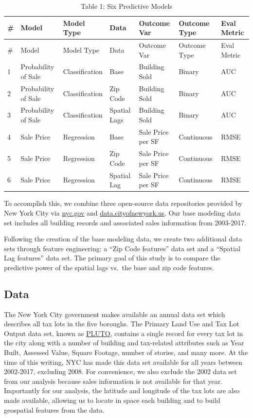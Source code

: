 \documentclass[]{article}
\begin{document}
\begin{longtable}[]{@{}lllllll@{}}
\caption{Table 1: Six Predictive Models}\tabularnewline
\toprule
\# & Model & Model Type & Data & Outcome Var & Outcome Type & Eval
Metric\tabularnewline
\midrule
\endfirsthead
\toprule
\# & Model & Model Type & Data & Outcome Var & Outcome Type & Eval
Metric\tabularnewline
\midrule
\endhead
1 & Probability of Sale & Classification & Base & Building Sold & Binary
& AUC\tabularnewline
2 & Probability of Sale & Classification & Zip Code & Building Sold &
Binary & AUC\tabularnewline
3 & Probability of Sale & Classification & Spatial Lags & Building Sold
& Binary & AUC\tabularnewline
4 & Sale Price & Regression & Base & Sale Price per SF & Continuous &
RMSE\tabularnewline
5 & Sale Price & Regression & Zip Code & Sale Price per SF & Continuous
& RMSE\tabularnewline
6 & Sale Price & Regression & Spatial Lag & Sale Price per SF &
Continuous & RMSE\tabularnewline
\bottomrule
\end{longtable}

To accomplish this, we combine three open-source data repositories
provided by New York City via \url{nyc.gov} and
\url{data.cityofnewyork.us}. Our base modeling data set includes all
building records and associated sales information from 2003-2017.

Following the creation of the base modeling data, we create two
additional data sets through feature engineering: a ``Zip Code
features'' data set and a ``Spatial Lag features'' data set. The primary
goal of this study is to compare the predictive power of the spatial
lags vs.~the base and zip code features.

\subsection{Data}\label{data}

The New York City government makes available an annual data set which
describes all tax lots in the five boroughs. The Primary Land Use and
Tax Lot Output data set, known as
\href{https://www1.nyc.gov/site/planning/data-maps/open-data/bytes-archive.page?sorts\%5Byear\%5D=0}{PLUTO},
contains a single record for every tax lot in the city along with a
number of building and tax-related attributes such as Year Built,
Assessed Value, Square Footage, number of stories, and many more. At the
time of this writing, NYC has made this data set available for all years
between 2002-2017, excluding 2008. For convenience, we also exclude the
2002 data set from our analysis because sales information is not
available for that year. Importantly for our analysis, the latitude and
longitude of the tax lots are also made available, allowing us to locate
in space each building and to build geospatial features from the data.
\end{document}
